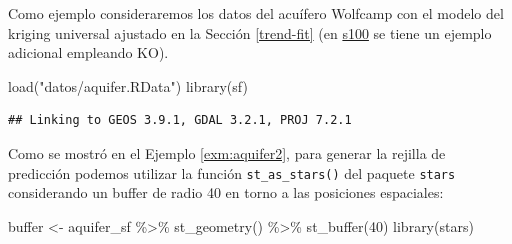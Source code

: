 \documentclass[
  spanish,
]{book}
\newenvironment{Shaded}{\begin{snugshade}}{\end{snugshade}}
\newcommand{\AttributeTok}[1]{\textcolor[rgb]{0.77,0.63,0.00}{#1}}
\newcommand{\CommentTok}[1]{\textcolor[rgb]{0.56,0.35,0.01}{\textit{#1}}}
\newcommand{\ConstantTok}[1]{\textcolor[rgb]{0.00,0.00,0.00}{#1}}
\newcommand{\DecValTok}[1]{\textcolor[rgb]{0.00,0.00,0.81}{#1}}
\newcommand{\FunctionTok}[1]{\textcolor[rgb]{0.00,0.00,0.00}{#1}}
\newcommand{\NormalTok}[1]{#1}
\newcommand{\OtherTok}[1]{\textcolor[rgb]{0.56,0.35,0.01}{#1}}
\newcommand{\SpecialCharTok}[1]{\textcolor[rgb]{0.00,0.00,0.00}{#1}}
\newcommand{\StringTok}[1]{\textcolor[rgb]{0.31,0.60,0.02}{#1}}
\theoremstyle{break}
\theoremstyle{definition}
\theoremstyle{definition}
\theoremstyle{definition}
\theoremstyle{definition}
\theoremstyle{remark}
\begin{document}
Como ejemplo consideraremos los datos del acuífero Wolfcamp con el modelo del kriging universal ajustado en la Sección \ref{trend-fit} (en \href{s100.html}{s100} se tiene un ejemplo adicional empleando KO).

\begin{Shaded}
\begin{Highlighting}[]
\FunctionTok{load}\NormalTok{(}\StringTok{"datos/aquifer.RData"}\NormalTok{)}
\FunctionTok{library}\NormalTok{(sf)}
\end{Highlighting}
\end{Shaded}

\begin{verbatim}
## Linking to GEOS 3.9.1, GDAL 3.2.1, PROJ 7.2.1
\end{verbatim}

\begin{Shaded}
\end{Shaded}

Como se mostró en el Ejemplo \ref{exm:aquifer2}, para generar la rejilla de predicción podemos utilizar la función \texttt{st\_as\_stars()} del paquete \texttt{stars} considerando un buffer de radio 40 en torno a las posiciones espaciales:

\begin{Shaded}
\begin{Highlighting}[]
\NormalTok{buffer }\OtherTok{\textless{}{-}}\NormalTok{ aquifer\_sf }\SpecialCharTok{\%\textgreater{}\%} \FunctionTok{st\_geometry}\NormalTok{() }\SpecialCharTok{\%\textgreater{}\%} \FunctionTok{st\_buffer}\NormalTok{(}\DecValTok{40}\NormalTok{)}
\FunctionTok{library}\NormalTok{(stars)}
\end{Highlighting}
\end{Shaded}
\end{document}
